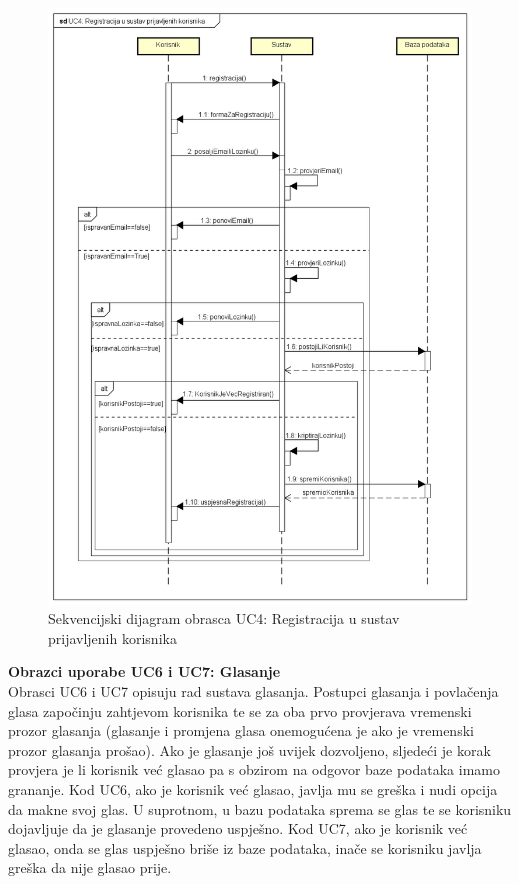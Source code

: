 				\begin{figure}[H]
					\includegraphics[width=\textwidth]{slike/uc4Sekvencijski.PNG} %
					\caption{Sekvencijski dijagram obrasca UC4: Registracija u sustav prijavljenih korisnika}
					\label{fig:uc4-sekvencijski} %
				\end{figure}
				\eject

				\textbf{Obrazci uporabe UC6 i UC7: Glasanje}\\
				Obrasci UC6 i UC7 opisuju rad sustava glasanja. Postupci glasanja i povlačenja glasa započinju zahtjevom korisnika te se za oba prvo provjerava vremenski prozor glasanja (glasanje i promjena glasa onemogućena je ako je vremenski prozor glasanja prošao). Ako je glasanje još uvijek dozvoljeno, sljedeći je korak provjera je li korisnik već glasao pa s obzirom na odgovor baze podataka imamo grananje. Kod UC6, ako je korisnik već glasao, javlja mu se greška i nudi opcija da makne svoj glas. U suprotnom, u bazu podataka sprema se glas te se korisniku dojavljuje da je glasanje provedeno uspješno. Kod UC7, ako je korisnik već glasao, onda se glas uspješno briše iz baze podataka, inače se korisniku javlja greška da nije glasao prije.
				
